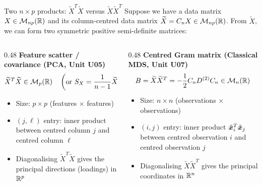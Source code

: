 \documentclass[aspectratio=169]{beamer}\usepackage[]{graphicx}\usepackage[]{xcolor}
\begin{document}

\begin{frame}{Two $n\times p$ products: $\widetilde{X}^T \widetilde{X}$ versus $\widetilde{X} \widetilde{X}^T$}
Suppose we have a data matrix $X\in\mathcal{M}_{np}(\mathbb{R})$ and its column-centred data matrix $\widetilde{X} = C_n X \in \mathcal{M}_{np}(\mathbb{R})$. From $\widetilde{X}$, we can form two symmetric positive semi-definite matrices:
\vfill
\begin{columns}[t]
\begin{column}{0.48\textwidth}
\textbf{Feature scatter / covariance (PCA, Unit U05)}
\[
\widetilde{X}^T \widetilde{X} \in \mathcal{M}_p(\mathbb{R}) \quad\left(\text{or } S_X = \frac{1}{n-1}\widetilde{X}^T \widetilde{X}\right)
\]
\begin{itemize}
\item Size: $p\times p$ (features $\times$ features)
\item $(j,\ell)$ entry: inner product between centred column $j$ and centred column $\ell$
\item Diagonalising $\widetilde{X}^T \widetilde{X}$ gives the principal directions (loadings) in $\mathbb{R}^p$
\end{itemize}
\end{column}
\begin{column}{0.48\textwidth}
\textbf{Centred Gram matrix (Classical MDS, Unit U07)}
\[
B = \widetilde{X} \widetilde{X}^T = -\frac{1}{2}C_n D^{(2)} C_n \in \mathcal{M}_n(\mathbb{R})
\]
\begin{itemize}
\item Size: $n\times n$ (observations $\times$ observations)
\item $(i,j)$ entry: inner product $\tilde{\bm{x}}_i^T\tilde{\bm{x}}_j$ between centred observation $i$ and centred observation $j$
\item Diagonalising $\widetilde{X} \widetilde{X}^T$ gives the principal coordinates in $\mathbb{R}^n$
\end{itemize}
\end{column}
\end{columns}
\end{frame}
\end{document}

